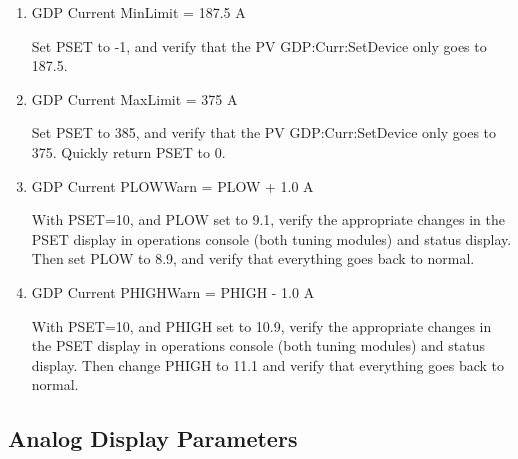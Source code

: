 \documentclass[11pt]{book}		%
\begin{document}
\begin{enumerate}
 \item GDP Current MinLimit = 187.5 A

\color{red}
Set PSET to -1, and verify that the PV GDP:Curr:SetDevice only goes to 187.5.
\color{black}

 \item GDP Current MaxLimit = 375 A

\color{red}
Set PSET to 385, and verify that the PV GDP:Curr:SetDevice only goes to 375. Quickly return PSET to 0.
\color{black}

 \item GDP Current PLOWWarn = PLOW + 1.0 A

\color{red}
With PSET=10, and PLOW set to 9.1, verify the appropriate changes in the PSET display in operations console (both tuning modules) and status display. Then set PLOW to 8.9, and verify that everything goes back to normal.
\color{black}

 \item GDP Current PHIGHWarn = PHIGH - 1.0 A

\color{red}
With PSET=10, and PHIGH set to 10.9, verify the appropriate changes in the PSET display in operations console (both tuning modules) and status display. Then change PHIGH to 11.1 and verify that everything goes back to normal.
\color{black}

\end{enumerate}

\subsection{Analog Display Parameters}
\end{document}
